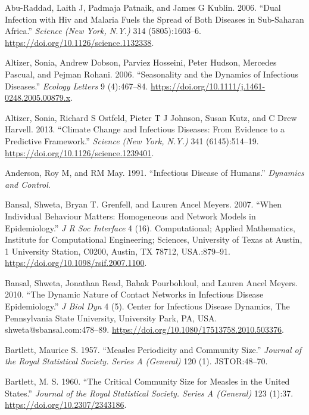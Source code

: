 \documentclass[]{book}
\theoremstyle{definition}
\theoremstyle{definition}
\theoremstyle{definition}
\theoremstyle{remark}
\begin{document}
\hypertarget{refs}{}
\leavevmode\hypertarget{ref-abu-raddad06}{}%
Abu-Raddad, Laith J, Padmaja Patnaik, and James G Kublin. 2006. ``Dual
Infection with Hiv and Malaria Fuels the Spread of Both Diseases in
Sub-Saharan Africa.'' \emph{Science (New York, N.Y.)} 314
(5805):1603--6. \url{https://doi.org/10.1126/science.1132338}.

\leavevmode\hypertarget{ref-altizer06}{}%
Altizer, Sonia, Andrew Dobson, Parviez Hosseini, Peter Hudson, Mercedes
Pascual, and Pejman Rohani. 2006. ``Seasonality and the Dynamics of
Infectious Diseases.'' \emph{Ecology Letters} 9 (4):467--84.
\url{https://doi.org/10.1111/j.1461-0248.2005.00879.x}.

\leavevmode\hypertarget{ref-altizer13}{}%
Altizer, Sonia, Richard S Ostfeld, Pieter T J Johnson, Susan Kutz, and C
Drew Harvell. 2013. ``Climate Change and Infectious Diseases: From
Evidence to a Predictive Framework.'' \emph{Science (New York, N.Y.)}
341 (6145):514--19. \url{https://doi.org/10.1126/science.1239401}.

\leavevmode\hypertarget{ref-anderson91}{}%
Anderson, Roy M, and RM May. 1991. ``Infectious Disease of Humans.''
\emph{Dynamics and Control}.

\leavevmode\hypertarget{ref-bansal07}{}%
Bansal, Shweta, Bryan T. Grenfell, and Lauren Ancel Meyers. 2007. ``When
Individual Behaviour Matters: Homogeneous and Network Models in
Epidemiology.'' \emph{J R Soc Interface} 4 (16). Computational; Applied
Mathematics, Institute for Computational Engineering; Sciences,
University of Texas at Austin, 1 University Station, C0200, Austin, TX
78712, USA.:879--91. \url{https://doi.org/10.1098/rsif.2007.1100}.

\leavevmode\hypertarget{ref-bansal10}{}%
Bansal, Shweta, Jonathan Read, Babak Pourbohloul, and Lauren Ancel
Meyers. 2010. ``The Dynamic Nature of Contact Networks in Infectious
Disease Epidemiology.'' \emph{J Biol Dyn} 4 (5). Center for Infectious
Disease Dynamics, The Pennsylvania State University, University Park,
PA, USA. shweta@sbansal.com:478--89.
\url{https://doi.org/10.1080/17513758.2010.503376}.

\leavevmode\hypertarget{ref-bartlett57}{}%
Bartlett, Maurice S. 1957. ``Measles Periodicity and Community Size.''
\emph{Journal of the Royal Statistical Society. Series A (General)} 120
(1). JSTOR:48--70.

\leavevmode\hypertarget{ref-bartlett60}{}%
Bartlett, M. S. 1960. ``The Critical Community Size for Measles in the
United States.'' \emph{Journal of the Royal Statistical Society. Series
A (General)} 123 (1):37. \url{https://doi.org/10.2307/2343186}.
\end{document}

